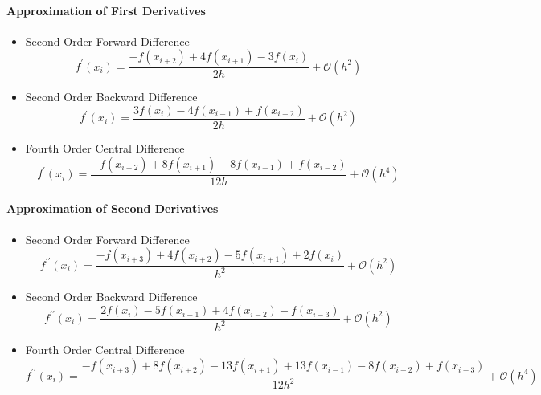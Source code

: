 \paragraph{Approximation of First Derivatives}
\begin{itemize}
     \item Second Order Forward Difference
	\begin{equation}
	     f^{\prime}\left(x_{i}\right) = \frac{-f\left(x_{i+2}\right) + 4f\left(x_{i+1}\right) - 3f\left(x_{i}\right)}{2h} 
               + \mathcal{O}\left(h^{2}\right)
	\end{equation}
     \item Second Order Backward Difference
	\begin{equation}
	     f^{\prime}\left(x_{i}\right) = \frac{3f\left(x_{i}\right) - 4f\left(x_{i-1}\right) + f\left(x_{i-2}\right)}{2h} 
               + \mathcal{O}\left(h^{2}\right)
	\end{equation}
     \item Fourth Order Central Difference
	\begin{equation}
	     f^{\prime}\left(x_{i}\right) = \frac{-f\left(x_{i+2}\right) + 8f\left(x_{i+1}\right) - 8f\left(x_{i-1}\right)+
               f\left(x_{i-2}\right)}{12h} + \mathcal{O}\left(h^{4}\right)
	\end{equation}
\end{itemize}

\paragraph{Approximation of Second Derivatives}
\begin{itemize}
     \item Second Order Forward Difference
	\begin{equation}
	     f^{\prime\prime}\left(x_{i}\right) = \frac{-f\left(x_{i+3}\right) + 4f\left(x_{i+2}\right) - 5f\left(x_{i+1}\right) +  
               2f\left(x_{i}\right)}{h^{2}} + \mathcal{O}\left(h^{2}\right)
	\end{equation}
     \item Second Order Backward Difference
	\begin{equation}
	     f^{\prime\prime}\left(x_{i}\right) = \frac{2f\left(x_{i}\right) - 5f\left(x_{i-1}\right) + 4f\left(x_{i-2}\right) - 
               f\left(x_{i-3}\right)}{h^{2}} + \mathcal{O}\left(h^{2}\right)
	\end{equation}
     \item Fourth Order Central Difference
	\begin{equation}
	     f^{\prime\prime}\left(x_{i}\right) = \frac{-f\left(x_{i+3}\right) + 8f\left(x_{i+2}\right) -13f\left(x_{i+1}\right) + 
               13f\left(x_{i-1}\right) - 8f\left(x_{i-2}\right) +  f\left(x_{i-3}\right)}{12h^{2}} + \mathcal{O}\left(h^{4}\right)
	\end{equation}
\end{itemize}

